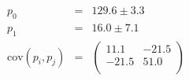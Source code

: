 \begin{align}
    p_0 &=& 129.6 \pm 3.3 \\
    p_1 &=& 16.0 \pm 7.1 \\
    \mathrm{cov}(p_i, p_j) &=& 
    \begin{pmatrix}
        11.1 &-21.5 \\
        -21.5 &51.0 \\
    \end{pmatrix}
\end{align}


